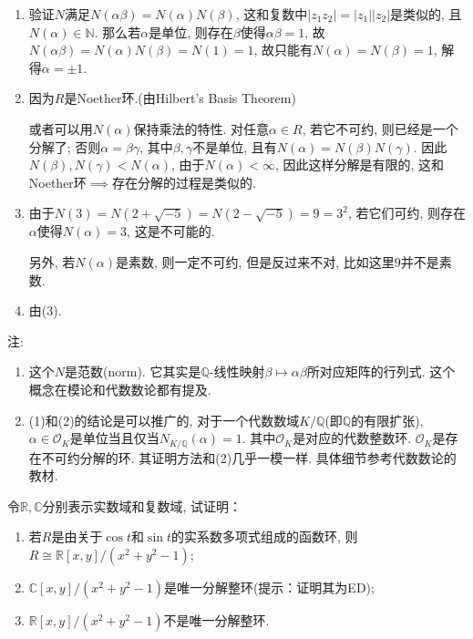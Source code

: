 \begin{solution}
\begin{enumerate}[(1)]
    \item 验证$N$满足$N(\alpha\beta) = N(\alpha)N(\beta)$, 这和复数中$|z_1z_2| = |z_1||z_2|$是类似的, 且$N(\alpha) \in \mathbb{N}$. 那么若$\alpha$是单位, 则存在$\beta$使得$\alpha\beta = 1$, 故$N(\alpha\beta) = N(\alpha)N(\beta) = N(1) = 1$, 故只能有$N(\alpha) = N(\beta) = 1$, 解得$\alpha = \pm 1$.
    \item 因为$R$是Noether环.(由Hilbert's Basis Theorem)
    
    或者可以用$N(\alpha)$保持乘法的特性. 对任意$\alpha \in R$, 若它不可约, 则已经是一个分解了; 否则$\alpha = \beta\gamma$, 其中$\beta, \gamma$不是单位, 且有$N(\alpha) = N(\beta)N(\gamma)$. 因此$N(\beta), N(\gamma) < N(\alpha)$, 由于$N(\alpha) < \infty$, 因此这样分解是有限的, 这和Noether环$\implies$存在分解的过程是类似的.
    \item 由于$N(3) = N(2 + \sqrt{-5}) = N(2 - \sqrt{-5}) = 9 = 3^2$, 若它们可约, 则存在$\alpha$使得$N(\alpha) = 3$, 这是不可能的.
    
    另外, 若$N(\alpha)$是素数, 则一定不可约, 但是反过来不对, 比如这里$9$并不是素数.
    \item 由(3).
\end{enumerate}
注: 
\begin{enumerate}[1.]
    \item 这个$N$是范数(norm). 它其实是$\mathbb{Q}$-线性映射$\beta \mapsto \alpha\beta$所对应矩阵的行列式. 这个概念在模论和代数数论都有提及.
    \item (1)和(2)的结论是可以推广的, 对于一个代数数域$K/\mathbb{Q}$(即$\mathbb{Q}$的有限扩张), $\alpha \in \mathcal{O}_K$是单位当且仅当$N_{K/\mathbb{Q}}(\alpha) = 1$. 其中$\mathcal{O}_K$是对应的代数整数环. $\mathcal{O}_K$是存在不可约分解的环. 其证明方法和(2)几乎一模一样. 具体细节参考代数数论的教材.
\end{enumerate}
\end{solution}

\begin{problem}
    令$\mathbb{R}, \mathbb{C}$分别表示实数域和复数域, 试证明：
\begin{enumerate}[(1)]
    \item 若$R$是由关于$\cos t$和$\sin t$的实系数多项式组成的函数环, 
则$R \cong \mathbb{R}[x, y]/(x^2 + y^2 - 1)$;
    \item $\mathbb{C}[x, y]/(x^2 + y^2 - 1)$是唯一分解整环(提示：证明其为ED);
    \item $\mathbb{R}[x, y]/(x^2 + y^2 - 1)$不是唯一分解整环.
\end{enumerate}
\end{problem}

